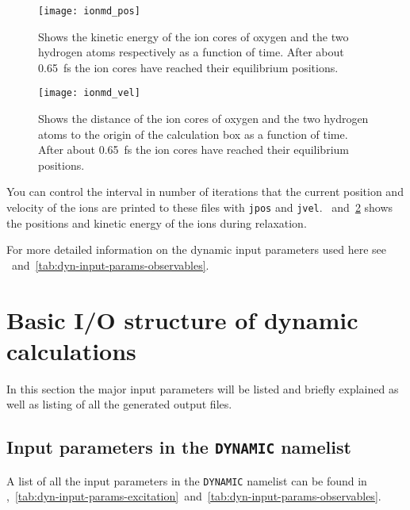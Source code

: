 \documentclass[11pt,a4paper]{article}
\begin{document}
			\begin{figure}[!htbp]
				\centering
				\texttt{[image: ionmd\_pos]}
				\caption{Shows the kinetic energy of the ion cores of oxygen and the two hydrogen atoms respectively as a function of time. After about 0.65~fs the ion cores have reached their equilibrium positions.}\label{fig:ionmd-pos}
			\end{figure}

			\begin{figure}[!htbp]
				\centering
				\texttt{[image: ionmd\_vel]}
				\caption{Shows the distance of the ion cores of oxygen and the two hydrogen atoms to the origin of the calculation box as a function of time. After about 0.65~fs the ion cores have reached their equilibrium positions.}\label{fig:ionmd-vel}
			\end{figure}
			
			You can control the interval in number of iterations that the current position and velocity of the ions are printed to these files with \texttt{jpos} and \texttt{jvel}. ~and~\ref{fig:ionmd-vel} shows the positions and kinetic energy of the ions during relaxation.
			
			For more detailed information on the dynamic input parameters used here see ~and~\ref{tab:dyn-input-params-observables}.

	\section{Basic I/O structure of dynamic calculations}
		In this section the major input parameters will be listed and briefly explained as well as listing of all the generated output files. 
		
		\subsection{Input parameters in the \texttt{DYNAMIC} namelist}
			A list of all the input parameters in the \texttt{DYNAMIC} namelist can be found in ,~\ref{tab:dyn-input-params-excitation}~and~\ref{tab:dyn-input-params-observables}.
			
\end{document}
